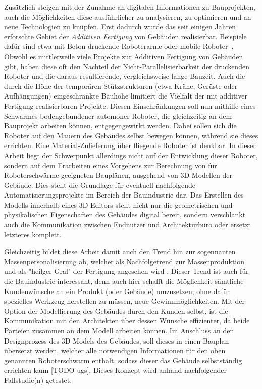 Zusätzlich steigen mit der Zunahme an digitalen Informationen zu Bauprojekten, auch die Möglichkeiten diese ausführlicher zu analysieren, zu optimieren und an neue Technologien zu knüpfen.
Erst dadurch wurde das seit einigen Jahren erforschte Gebiet der \textit{Additiven Fertigung} von Gebäuden realisierbar.
Beispiele dafür sind etwa mit Beton druckende Roboterarme oder mobile Roboter~\cite{AdditiveManufacturingUsingMobileRobots}. %
Obwohl es mittlerweile viele Projekte zur Additiven Fertigung von Gebäuden gibt, haben diese oft den Nachteil der Nicht-Parallelisierbarkeit der druckenden Roboter und die daraus resultierende, vergleichsweise lange Bauzeit.
Auch die durch die Höhe der temporären Stützstrukturen (etwa Kräne, Gerüste oder Aufhängungen) eingeschränkte Bauhöhe limitiert die Vielfalt der mit additiver Fertigung realisierbaren Projekte.
Diesen Einschränkungen soll nun mithilfe eines Schwarmes bodengebundener automoner Roboter, die gleichzeitig an dem Bauprojekt arbeiten können, entgegengewirkt werden.
Dabei sollen sich die Roboter auf den Mauern des Gebäudes selbst bewegen können, während sie dieses errichten.
Eine Material-Zulieferung über fliegende Roboter ist denkbar.
In dieser Arbeit liegt der Schwerpunkt allerdings nicht auf der Entwicklung dieser Roboter, sondern auf dem Erarbeiten eines Vorgehens zur Berechnung von für Roboterschwärme geeigneten Bauplänen, ausgehend von 3D Modellen der Gebäude.
Dies stellt die Grundlage für eventuell nachfolgende Automatisierungsprojekte im Bereich der Bauindustrie dar.
Das Erstellen des Modells innerhalb eines 3D Editors stellt nicht nur die geometrischen und physikalischen Eigenschaften des Gebäudes digital bereit, sondern verschlankt auch die Kommunikation zwischen Endnutzer und Architekturbüro oder ersetzt letzteres komplett.

Gleichzeitig bildet diese Arbeit damit auch den Trend hin zur sogennanten Massenpersonalisierung ab, welcher als Nachfolgetrend zur Massenproduktion und als "heilger Gral" der Fertigung angesehen wird
.
Dieser Trend ist auch für die Bauindustrie interessant, denn auch hier schafft die Möglichkeit sämtliche 
Kundenwünsche an ein Produkt (oder Gebäude) umzusetzen, ohne dafür spezielles Werkzeug herstellen zu müssen, neue Gewinnmöglichkeiten.
Mit der Option der Modellierung des Gebäudes durch den Kunden selbst, ist die Kommunikation mit den Architekten über dessen Wünsche effizienter, da beide Parteien zusammen an dem Modell arbeiten können.
Im Anschluss an den Designprozess des 3D Models des Gebäudes, soll dieses in einen Bauplan übersetzt werden, welcher alle notwendigen Informationen für den oben genannten Roboterschwarm enthält, sodass dieser das Gebäude selbstständig errichten kann [TODO ugs].
Dieses Konzept wird anhand nachfolgender Fallstudie(n) getestet.



